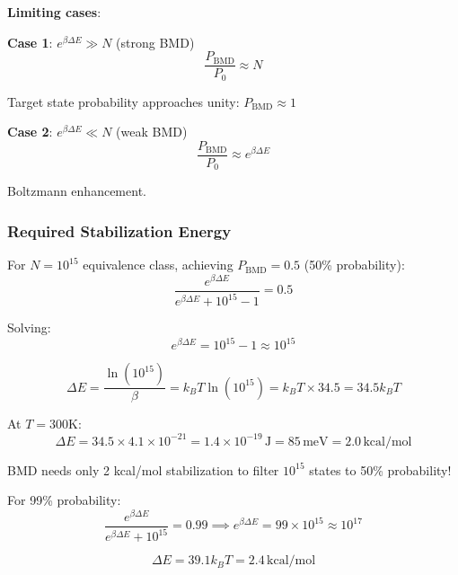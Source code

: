 \documentclass[11pt,onecolumn]{article}
\begin{document}
\textbf{Limiting cases}:

\textbf{Case 1}: $e^{\beta\Delta E} \gg N$ (strong BMD)
\begin{equation}
\frac{P_{\text{BMD}}}{P_0} \approx N
\end{equation}

Target state probability approaches unity: $P_{\text{BMD}} \approx 1$

\textbf{Case 2}: $e^{\beta\Delta E} \ll N$ (weak BMD)
\begin{equation}
\frac{P_{\text{BMD}}}{P_0} \approx e^{\beta\Delta E}
\end{equation}

Boltzmann enhancement.

\subsubsection{Required Stabilization Energy}

For $N = 10^{15}$ equivalence class, achieving $P_{\text{BMD}} = 0.5$ (50\% probability):
\begin{equation}
\frac{e^{\beta\Delta E}}{e^{\beta\Delta E} + 10^{15} - 1} = 0.5
\end{equation}

Solving:
\begin{equation}
e^{\beta\Delta E} = 10^{15} - 1 \approx 10^{15}
\end{equation}

\begin{equation}
\Delta E = \frac{\ln(10^{15})}{\beta} = k_B T \ln(10^{15}) = k_B T \times 34.5 = 34.5 k_B T
\end{equation}

At $T = 300$K:
\begin{equation}
\Delta E = 34.5 \times 4.1 \times 10^{-21} = 1.4 \times 10^{-19}\,\text{J} = 85\,\text{meV} = 2.0\,\text{kcal/mol}
\end{equation}

BMD needs only 2 kcal/mol stabilization to filter $10^{15}$ states to 50\% probability!

For 99\% probability:
\begin{equation}
\frac{e^{\beta\Delta E}}{e^{\beta\Delta E} + 10^{15}} = 0.99 \implies e^{\beta\Delta E} = 99 \times 10^{15} \approx 10^{17}
\end{equation}

\begin{equation}
\Delta E = 39.1 k_B T = 2.4\,\text{kcal/mol}
\end{equation}
\end{document}
